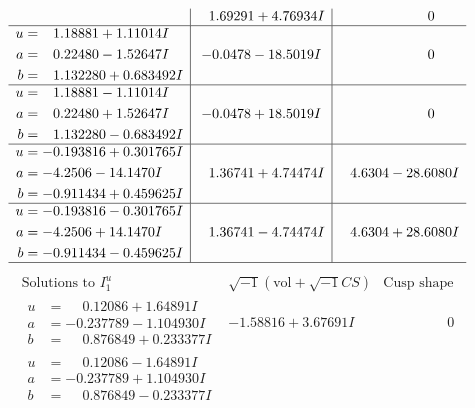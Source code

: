 \documentclass[1p]{elsarticle_modified}
\theoremstyle{definition}
\newcommand{\I}{\sqrt{-1}}
\begin{document}
$$\begin{array}{c|c|c}
 & \phantom{-}1.69291 + 4.76934 I & \phantom{-0.000000 } 0 \\ \hline\begin{aligned}
u &= \phantom{-}1.18881 + 1.11014 I \\
a &= \phantom{-}0.22480 - 1.52647 I \\
b &= \phantom{-}1.132280 + 0.683492 I\end{aligned}
 & -0.0478 - 18.5019 I & \phantom{-0.000000 } 0 \\ \hline\begin{aligned}
u &= \phantom{-}1.18881 - 1.11014 I \\
a &= \phantom{-}0.22480 + 1.52647 I \\
b &= \phantom{-}1.132280 - 0.683492 I\end{aligned}
 & -0.0478 + 18.5019 I & \phantom{-0.000000 } 0 \\ \hline\begin{aligned}
u &= -0.193816 + 0.301765 I \\
a &= -4.2506 - 14.1470 I \\
b &= -0.911434 + 0.459625 I\end{aligned}
 & \phantom{-}1.36741 + 4.74474 I & \phantom{-}4.6304 - 28.6080 I \\ \hline\begin{aligned}
u &= -0.193816 - 0.301765 I \\
a &= -4.2506 + 14.1470 I \\
b &= -0.911434 - 0.459625 I\end{aligned}
 & \phantom{-}1.36741 - 4.74474 I & \phantom{-}4.6304 + 28.6080 I\\
 \hline 
 \end{array}$$\newpage$$\begin{array}{c|c|c}  
\text{Solutions to }I^u_{1}& \I (\text{vol} + \sqrt{-1}CS) & \text{Cusp shape}\\
 \hline 
\begin{aligned}
u &= \phantom{-}0.12086 + 1.64891 I \\
a &= -0.237789 - 1.104930 I \\
b &= \phantom{-}0.876849 + 0.233377 I\end{aligned}
 & -1.58816 + 3.67691 I & \phantom{-0.000000 } 0 \\ \hline\begin{aligned}
u &= \phantom{-}0.12086 - 1.64891 I \\
a &= -0.237789 + 1.104930 I \\
b &= \phantom{-}0.876849 - 0.233377 I\end{aligned}

\end{array}$$
\end{document}
